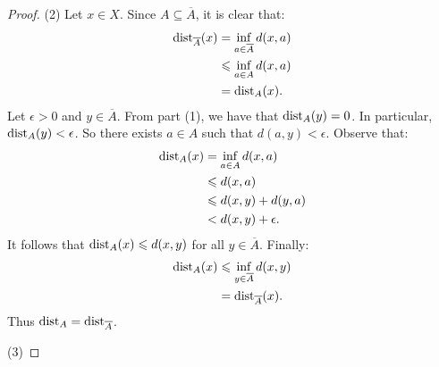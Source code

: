 \begin{proof}
            (2) Let $x \in X$. Since $A \subseteq \overline{A}$, it is clear that:
                \begin{equation*}
                \begin{split}
                    \operatorname{dist}_{\overline{A}}(x) 
                    & = \inf_{a \in \overline{A}} d(x,a) \\
                    & \leqslant \inf_{a \in A}d(x,a) \\
                    & = \operatorname{dist}_A(x).
                \end{split}
                \end{equation*}
            Let $\epsilon > 0$ and $y \in \overline{A}$. From part (1), we have that $\operatorname{dist}_A(y) = 0$. In particular, $\operatorname{dist}_A(y) < \epsilon$. So there exists $a \in A$ such that $d(a,y) < \epsilon$. Observe that:
                \begin{equation*}
                \begin{split}
                    \operatorname{dist}_A(x) 
                    & = \inf_{a \in A}d(x,a) \\
                    & \leqslant d(x,a) \\
                    & \leqslant d(x,y) + d(y,a) \\
                    & < d(x,y) + \epsilon.
                \end{split}
                \end{equation*}
            It follows that $\operatorname{dist}_A(x) \leqslant d(x,y)$ for all $y \in \overline{A}$. Finally:
                \begin{equation*}
                \begin{split}
                    \operatorname{dist}_A(x) 
                    & \leqslant \inf_{y \in \overline{A}}d(x,y) \\
                    & = \operatorname{dist}_{\overline{A}}(x).
                \end{split}
                \end{equation*}
            Thus $\operatorname{dist}_A = \operatorname{dist}_{\overline{A}}$.

            (3)
        \end{proof}

\newpage
